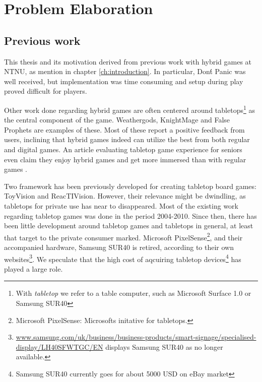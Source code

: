 \chapter{Problem Elaboration}

\section{Previous work}
This thesis and its motivation derived from previous work with hybrid games at NTNU, as mention in chapter \ref{ch:introduction}. In particular, Don\'t Panic was well received, but implementation was time consuming and setup during play proved difficult for players\cite{di2012don}. 

Other work done regarding hybrid games are often centered around tabletops\footnote{With \emph{tabletop} we refer to a table computer, such as Microsoft Surface 1.0 or Samsung SUR40} as the central component of the game. Weathergods\cite{bakker2007weathergods}, KnightMage\cite{magerkurth2004towards} and False Prophets\cite{mandryk2002false} are examples of these. Most of these report a positive feedback from users, inclining that hybrid games indeed can utilize the best from both regular and digital games. An article evaluating tabletop game experience for seniors even claim they enjoy hybrid games and get more immersed than with regular games \cite{al2008designing}.

Two framework has been previously developed for creating tabletop board games: ToyVision\cite{marco2012toyvision} and ReacTIVision\cite{kaltenbrunner2007reactivision}. However, their relevance might be dwindling, as tabletops for private use has near to disappeared. Most of the existing work regarding tabletop games was done in the period 2004-2010. Since then, there has been little development around tabletop games and tabletops in general, at least that target to the private consumer marked. Microsoft PixelSense\footnote{Microsoft PixelSense: Microsofts initative for tabletops.}, and their accompanied hardware, Samsung SUR40 is retired, according to their own websites\footnote{\href{http://www.samsung.com/uk/business/business-products/smart-signage/specialised-display/LH40SFWTGC/EN}{www.samsung.com/uk/business/business-products/smart-signage/specialised-display/LH40SFWTGC/EN} displays Samsung SUR40 as no longer available.}. We speculate that the high cost of aqcuiring tabletop devices\footnote{Samsung SUR40 currently goes for about 5000 USD on eBay market} has played a large role.

